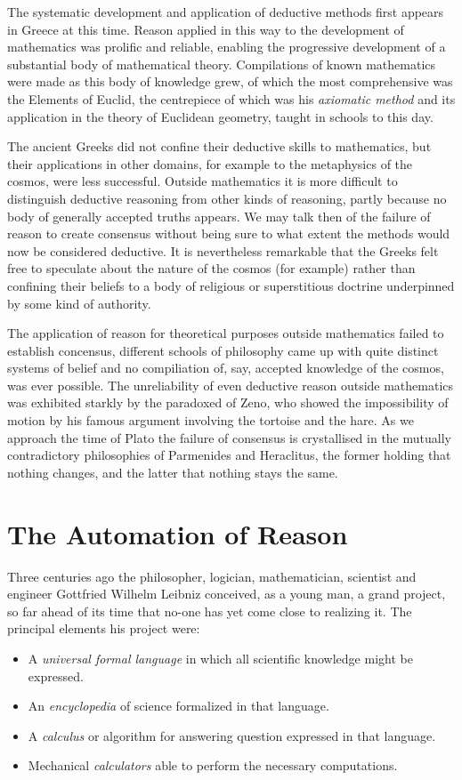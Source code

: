 The systematic development and application of deductive methods first appears in Greece at this time.
Reason applied in this way to the development of mathematics was prolific and reliable,
enabling the progressive development of a substantial body of mathematical theory.
Compilations of known mathematics were made as this body of knowledge grew,
of which the most comprehensive was the Elements of Euclid, the centrepiece of which
was his {\it axiomatic method} and its application in the theory of Euclidean geometry,
taught in schools to this day.

The ancient Greeks did not confine their deductive skills to mathematics,
but their applications in other domains, for example to the metaphysics of the cosmos,
were less successful.
Outside mathematics it is more difficult to distinguish deductive reasoning from other
kinds of reasoning, partly because no body of generally accepted truths appears.
We may talk then of the failure of reason to create consensus without being sure to
what extent the methods would now be considered deductive.
It is nevertheless remarkable that the Greeks felt free to speculate about the
nature of the cosmos (for example) rather than confining their beliefs to a body
of religious or superstitious doctrine underpinned by some kind of authority.

The application of reason for theoretical purposes outside mathematics failed to
establish concensus, different schools of philosophy came up with quite distinct
systems of belief and no compiliation of, say, accepted knowledge of the cosmos,
was ever possible.
The unreliability of even deductive reason outside mathematics was exhibited
starkly by the paradoxed of Zeno, who showed the impossibility of motion by
his famous argument involving the tortoise and the hare. 
As we approach the time of Plato the failure of consensus is crystallised
in the mutually contradictory philosophies of Parmenides and Heraclitus,
the former holding that nothing changes, and the latter that nothing stays the same.

\section{The Automation of Reason}

Three centuries ago the philosopher, logician, mathematician,
scientist and engineer Gottfried Wilhelm Leibniz conceived, as a young
man, a grand project, so far ahead of its time that no-one has yet
come close to realizing it.
The principal elements his project were:
\begin{itemize}
\item A {\it universal formal language} in which all scientific
  knowledge might be expressed.
\item An {\it encyclopedia} of science formalized in that language.
\item A {\it calculus} or algorithm for answering question expressed
  in that language.
\item Mechanical {\it calculators} able to perform the necessary computations.
\end{itemize}

